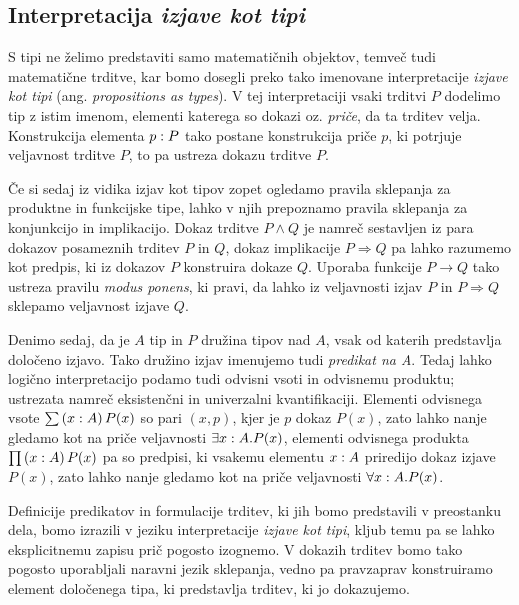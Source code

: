 \subsection{Interpretacija \emph{izjave kot tipi}}

S tipi ne želimo predstaviti samo matematičnih objektov, temveč tudi matematične trditve,
kar bomo dosegli preko tako imenovane interpretacije \emph{izjave kot tipi}
(ang. \emph{propositions as types}). V tej interpretaciji vsaki trditvi \(P\) dodelimo
tip z istim imenom, elementi katerega so dokazi oz. \emph{priče}, da ta trditev velja.
Konstrukcija
elementa \(p : P\) tako postane konstrukcija priče \(p\), ki potrjuje
veljavnost trditve \(P\), to pa ustreza dokazu trditve \(P\).

Če si sedaj iz vidika izjav kot tipov zopet ogledamo pravila sklepanja za produktne in
funkcijske tipe, lahko v njih prepoznamo
pravila sklepanja za konjunkcijo in implikacijo. Dokaz trditve \(P \wedge Q\) je namreč sestavljen
iz para dokazov posameznih trditev \(P\) in \(Q\), dokaz implikacije \(P \Rightarrow Q\) pa lahko razumemo
kot predpis, ki iz dokazov \(P\) konstruira dokaze \(Q\). Uporaba funkcije \(P \to Q\)
tako ustreza pravilu \emph{modus ponens}, ki pravi, da lahko iz veljavnosti izjav \(P\) in \(P \Rightarrow Q\)
sklepamo veljavnost izjave \(Q\).

Denimo sedaj, da je \(A\) tip in \(P\) družina tipov nad \(A\), vsak od katerih predstavlja določeno
izjavo. Tako družino izjav imenujemo tudi \emph{predikat na A}.
Tedaj lahko logično interpretacijo podamo tudi odvisni vsoti in odvisnemu produktu;
ustrezata namreč eksistenčni in univerzalni kvantifikaciji. Elementi odvisnega vsote
\(\sum \left( x : A \right) P(x)\) so pari \((x, p)\), kjer je \(p\) dokaz \(P(x)\), zato lahko nanje gledamo
kot na priče veljavnosti \(\exists x : A. P(x)\), elementi odvisnega produkta
\(\prod \left( x : A \right) P(x)\) pa so predpisi, ki vsakemu elementu \(x : A\) priredijo
dokaz izjave \(P(x)\), zato lahko nanje gledamo kot na priče veljavnosti
\(\forall x : A.P(x)\).

Definicije predikatov in formulacije trditev, ki jih bomo predstavili v preostanku dela, bomo
izrazili v jeziku interpretacije \emph{izjave kot tipi}, kljub temu pa se lahko eksplicitnemu
zapisu prič pogosto izognemo. V dokazih trditev bomo tako pogosto uporabljali naravni
jezik sklepanja, vedno pa pravzaprav konstruiramo element določenega tipa, ki predstavlja trditev,
ki jo dokazujemo.

